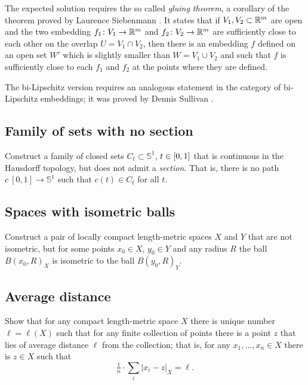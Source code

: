 The expected solution requires the so called \emph{gluing theorem},
a corollary of the theorem proved by Laurence Siebenmann \cite{siebenmann}.
It states that 
if $V_1, V_2\subset\mathbb{R}^m$ are open
and the two embedding $f_1\colon V_1\to\mathbb{R}^m$ and $f_2\colon V_2\to\mathbb{R}^m$ 
are sufficiently close to each other 
on the overlap $U=V_1\cap V_2$, 
then
there is an embedding $f$ defined on an open set $W'$
which is slightly smaller than $W=V_1\cup V_2$
and such that $f$ is sufficiently close to each $f_1$ and $f_2$ at the points where they are defined.

The  bi-Lipschitz version requires 
an analogous statement in the category of bi-Lipschitz embeddings;
it was proved by
Dennis Sullivan \cite{sullivan}.

\subsection*{Family of sets with no section\easy}
\label{hausdorff-section} 

\begin{pr}
Construct a family of closed sets $C_t\subset\mathbb{S}^1$, $t\z\in [0,1]$ that is continuous in the Hausdorff topology, 
but does not admit a {}\emph{section}.
That is, there is no path $c\:[0,1]\to \mathbb{S}^1$ such that $c(t)\in C_t$ for all $t$.
\end{pr}

\subsection*{Spaces with isometric balls}

\begin{pr}
Construct a pair of locally compact length-metric spaces $X$ and $Y$ 
that are not isometric,
but for some points $x_0\in X$,  $y_0\in Y$ and any radius $R$
the ball $B(x_0,R)_X$ is 
isometric to the ball $B(y_0,R)_Y$.
\end{pr}

\subsection*{Average distance\easy}

\begin{pr}
Show that for any compact length-metric space $X$ there is unique number $\ell=\ell(X)$ such that for any finite collection of points there is a point $z$ that lies of average distance $\ell$ from the collection;
that is, for any $x_1,\dots,x_n\in X$ there is $z\in X$ such that
\[\tfrac1n\cdot\sum_i|x_i-z|_X=\ell.\]

\end{pr}



